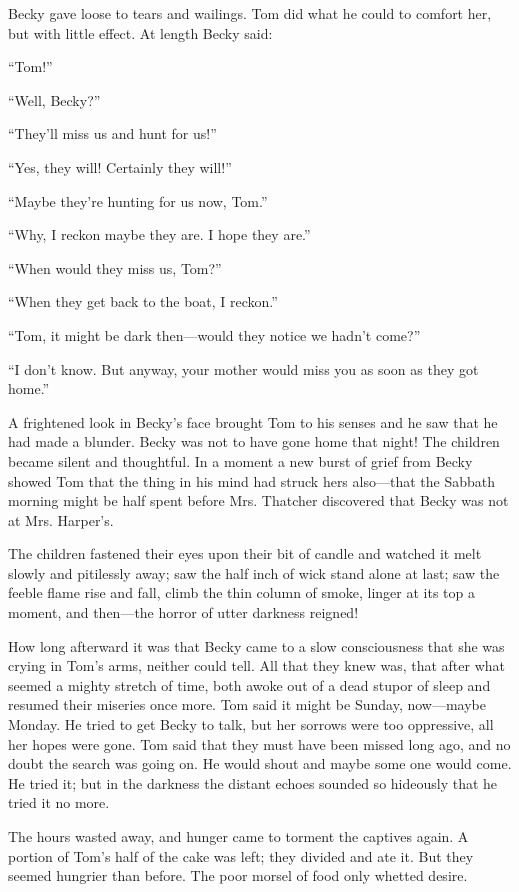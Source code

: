 \documentclass{book}
\begin{document}
Becky gave loose to tears and wailings. Tom did what he could to comfort her, but with little effect. At length Becky said:

“Tom!”

“Well, Becky?”

“They’ll miss us and hunt for us!”

“Yes, they will! Certainly they will!”

“Maybe they’re hunting for us now, Tom.”

“Why, I reckon maybe they are. I hope they are.”

“When would they miss us, Tom?”

“When they get back to the boat, I reckon.”

“Tom, it might be dark then—would they notice we hadn’t come?”

“I don’t know. But anyway, your mother would miss you as soon as they got home.”

A frightened look in Becky’s face brought Tom to his senses and he saw that he had made a blunder. Becky was not to have gone home that night! The children became silent and thoughtful. In a moment a new burst of grief from Becky showed Tom that the thing in his mind had struck hers also—that the Sabbath morning might be half spent before Mrs. Thatcher discovered that Becky was not at Mrs. Harper’s.

The children fastened their eyes upon their bit of candle and watched it melt slowly and pitilessly away; saw the half inch of wick stand alone at last; saw the feeble flame rise and fall, climb the thin column of smoke, linger at its top a moment, and then—the horror of utter darkness reigned!

How long afterward it was that Becky came to a slow consciousness that she was crying in Tom’s arms, neither could tell. All that they knew was, that after what seemed a mighty stretch of time, both awoke out of a dead stupor of sleep and resumed their miseries once more. Tom said it might be Sunday, now—maybe Monday. He tried to get Becky to talk, but her sorrows were too oppressive, all her hopes were gone. Tom said that they must have been missed long ago, and no doubt the search was going on. He would shout and maybe some one would come. He tried it; but in the darkness the distant echoes sounded so hideously that he tried it no more.

The hours wasted away, and hunger came to torment the captives again. A portion of Tom’s half of the cake was left; they divided and ate it. But they seemed hungrier than before. The poor morsel of food only whetted desire.
\end{document}
